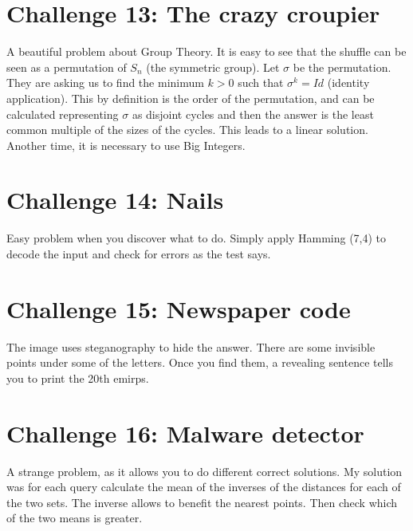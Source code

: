 \documentclass[english,12pt,a4paper]{article}
\begin{document}

\newpage

\section{Challenge 13: The crazy croupier}
A beautiful problem about Group Theory. It is easy to see that the shuffle can be seen as a permutation of $S_n$ (the symmetric group). Let $\sigma$ be the permutation. They are asking us to find the minimum $k > 0$ such that $\sigma^k = Id$ (identity application). This by definition is the order of the permutation, and can be calculated representing $\sigma$ as disjoint cycles and then the answer is the least common multiple of the sizes of the cycles. This leads to a linear solution. Another time, it is necessary to use Big Integers.

\newpage

\section{Challenge 14: Nails}
Easy problem when you discover what to do. Simply apply Hamming (7,4) to decode the input and check for errors as the test says.

\newpage

\section{Challenge 15: Newspaper code}
The image uses steganography to hide the answer. There are some invisible points under some of the letters. Once you find them, a revealing sentence tells you to print the 20th emirps.

\newpage

\section{Challenge 16: Malware detector}
A strange problem, as it allows you to do different correct solutions. My solution was for each query calculate the mean of the inverses of the distances for each of the two sets. The inverse allows to benefit the nearest points. Then check which of the two means is greater.


\newpage
\end{document}
